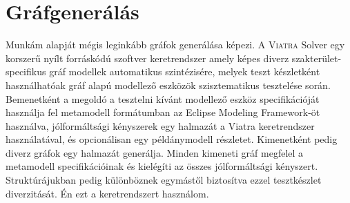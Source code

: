 \section{Gráfgenerálás}
Munkám alapját mégis leginkább gráfok generálása képezi. A \textsc{Viatra} Solver \cite{viatrasolver} egy korszerű nyílt forráskódú szoftver keretrendszer amely képes diverz szakterület-specifikus gráf modellek automatikus szintézisére, melyek teszt készletként használhatóak gráf alapú modellező eszközök szisztematikus tesztelése során.
Bemenetként a megoldó a tesztelni kívánt modellező eszköz specifikációját használja fel metamodell formátumban az Eclipse Modeling Framework-öt használva, jólformáltsági kényszerek egy halmazát a Viatra keretrendszer használatával, és opcionálisan egy példánymodell részletet. Kimenetként pedig diverz gráfok egy halmazát generálja. 
Minden kimeneti gráf megfelel a metamodell specifikációinak és kielégíti az összes jólformáltsági kényszert. Struktúrájukban pedig különböznek egymástől biztosítva ezzel tesztkészlet diverzitását. Én ezt a keretrendszert használom.






